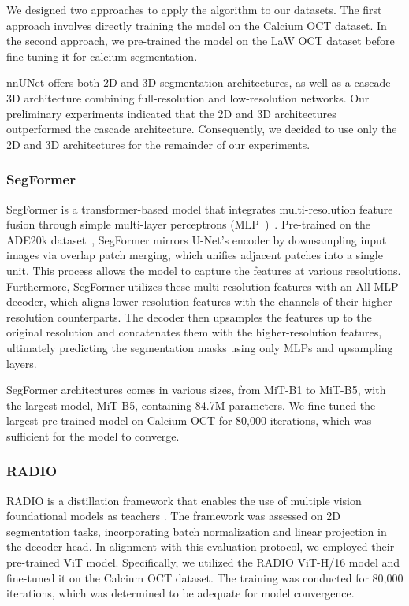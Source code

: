 \documentclass[a4paper,11pt,oneside]{report}
\begin{document}
We designed two approaches to apply the algorithm to our datasets. The first approach involves directly training the model on the Calcium OCT dataset. In the second approach, we pre-trained the model on the LaW OCT dataset before fine-tuning it for calcium segmentation. 

nnUNet offers both 2D and 3D segmentation architectures, as well as a cascade 3D architecture combining full-resolution and low-resolution networks. Our preliminary experiments indicated that the 2D and 3D architectures outperformed the cascade architecture. Consequently, we decided to use only the 2D and 3D architectures for the remainder of our experiments.

\subsubsection{SegFormer}
SegFormer is a transformer-based model that integrates multi-resolution feature fusion through simple multi-layer perceptrons (MLP~\cite{Rumelhart1986})~\cite{Xie2021SegFormer}. Pre-trained on the ADE20k dataset~\cite{Zhou2018}, SegFormer mirrors U-Net's encoder by downsampling input images via overlap patch merging, which unifies adjacent patches into a single unit. This process allows the model to capture the features at various resolutions. Furthermore, SegFormer utilizes these multi-resolution features with an All-MLP decoder, which aligns lower-resolution features with the channels of their higher-resolution counterparts. The decoder then upsamples the features up to the original resolution and concatenates them with the higher-resolution features, ultimately predicting the segmentation masks using only MLPs and upsampling layers. 

SegFormer architectures comes in various sizes, from MiT-B1 to MiT-B5, with the largest model, MiT-B5, containing 84.7M parameters. We fine-tuned the largest pre-trained model on Calcium OCT for 80,000 iterations, which was sufficient for the model to converge.

\subsubsection{RADIO}
RADIO is a distillation framework that enables the use of multiple vision foundational models as teachers \cite{Ranzinger2024RADIO}. The framework was assessed on 2D segmentation tasks, incorporating batch normalization and linear projection in the decoder head. In alignment with this evaluation protocol, we employed their pre-trained ViT model. Specifically, we utilized the RADIO ViT-H/16 model and fine-tuned it on the Calcium OCT dataset. The training was conducted for 80,000 iterations, which was determined to be adequate for model convergence.
\end{document}
